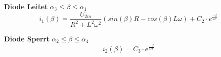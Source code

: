 \textbf{Diode Leitet} $ \alpha_3 \leq \beta \leq \alpha_1 $\newline
\[ i_{1}(\beta) = \frac{U_{2m}}{R^2 + L^2\omega^2}\left(sin(\beta) R - cos(\beta) L\omega\right) + C_2 \cdot e^{\frac{-\beta}{\omega \tau}} \]

\textbf{Diode Sperrt} $ \alpha_2 \leq \beta \leq \alpha_4 $\newline
\[ i_2(\beta) =  C_3 \cdot e^{\frac{-\beta}{\omega \tau}} \]

\clearpage








